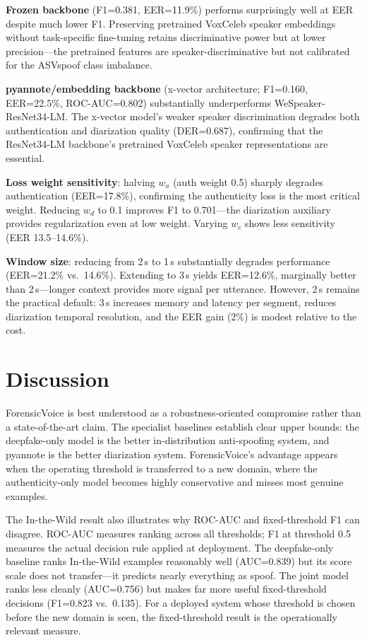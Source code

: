 \documentclass{article}
\newcommand{\fv}{ForensicVoice}
\begin{document}
\textbf{Frozen backbone} (F1=0.381, EER=11.9\%) performs surprisingly well at
EER despite much lower F1. Preserving pretrained VoxCeleb speaker embeddings
without task-specific fine-tuning retains discriminative power but at lower
precision---the pretrained features are speaker-discriminative but not
calibrated for the ASVspoof class imbalance.

\textbf{pyannote/embedding backbone} (x-vector architecture; F1=0.160,
EER=22.5\%, ROC-AUC=0.802) substantially underperforms WeSpeaker-ResNet34-LM.
The x-vector model's weaker speaker discrimination degrades both authentication
and diarization quality (DER=0.687), confirming that the ResNet34-LM backbone's
pretrained VoxCeleb speaker representations are essential.

\textbf{Loss weight sensitivity}: halving $w_a$ (auth weight 0.5) sharply
degrades authentication (EER=17.8\%), confirming the authenticity loss is
the most critical weight. Reducing $w_d$ to 0.1 improves F1 to 0.701---the
diarization auxiliary provides regularization even at low weight. Varying $w_c$
shows less sensitivity (EER 13.5--14.6\%).

\textbf{Window size}: reducing from 2\,s to 1\,s substantially degrades
performance (EER=21.2\% vs.\ 14.6\%). Extending to 3\,s yields EER=12.6\%,
marginally better than 2\,s---longer context provides more signal per utterance.
However, 2\,s remains the practical default: 3\,s increases memory and latency
per segment, reduces diarization temporal resolution, and the EER gain (2\%)
is modest relative to the cost.

\section{Discussion}

\fv{} is best understood as a robustness-oriented compromise rather than a
state-of-the-art claim. The specialist baselines establish clear upper bounds:
the deepfake-only model is the better in-distribution anti-spoofing system, and
pyannote is the better diarization system. \fv{}'s advantage appears when the
operating threshold is transferred to a new domain, where the authenticity-only
model becomes highly conservative and misses most genuine examples.

The In-the-Wild result also illustrates why ROC-AUC and fixed-threshold F1 can
disagree. ROC-AUC measures ranking across all thresholds; F1 at threshold 0.5
measures the actual decision rule applied at deployment. The deepfake-only
baseline ranks In-the-Wild examples reasonably well (AUC=0.839) but its score
scale does not transfer---it predicts nearly everything as spoof. The joint
model ranks less cleanly (AUC=0.756) but makes far more useful fixed-threshold
decisions (F1=0.823 vs.\ 0.135). For a deployed system whose threshold is
chosen before the new domain is seen, the fixed-threshold result is the
operationally relevant measure.
\end{document}
